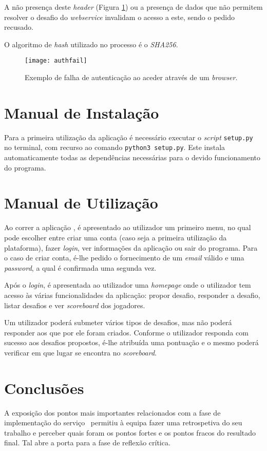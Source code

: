 A não presença deste \textit{header} (Figura \ref{fig::auth-fail}) ou a presença de dados que não permitem resolver o desafio do \textit{webservice} invalidam o acesso a este, sendo o pedido recusado.

O algoritmo de \textit{hash} utilizado no processo é o \textit{SHA256}.

\begin{figure}[!htbp]
    \centering
    \texttt{[image: authfail]}
    \caption[Falha de autenticação]{Exemplo de falha de autenticação ao aceder através de um \textit{browser}.}
    \label{fig::auth-fail}
\end{figure}



\section{Manual de Instalação}
\label{sec::implementacao:maninstall}

Para a primeira utilização da aplicação é necessário executar o \textit{script} \verb|setup.py| no terminal, com recurso ao comando \verb|python3 setup.py|. Este instala automaticamente todas as dependências necessárias para o devido funcionamento do programa.


\section{Manual de Utilização}
\label{sec::implementacao:manuser}

Ao correr a aplicação \appname, é apresentado ao utilizador um primeiro menu, no qual pode escolher entre criar uma conta (caso seja a primeira utilização da plataforma), fazer \textit{login}, ver informações da aplicação ou sair do programa.  Para o caso de criar conta, é-lhe pedido o fornecimento de um \textit{email} válido e uma \textit{password}, a qual é confirmada uma segunda vez.

Após o \textit{login}, é apresentada ao utilizador uma \textit{homepage} onde o utilizador tem acesso às várias funcionalidades da aplicação: propor desafio, responder a desafio, listar desafios e ver \textit{scoreboard} dos jogadores.

Um utilizador poderá submeter vários tipos de desafios, mas não poderá responder aos que por ele foram criados. Conforme o utilizador responda com sucesso aos desafios propostos, é-lhe atribuída uma pontuação e o mesmo poderá verificar em que lugar se encontra no \textit{scoreboard}.



\section{Conclusões}
\label{sec::implementacao:concs}

A exposição dos pontos mais importantes relacionados com a fase de implementação do serviço \appname~permitiu à equipa fazer uma retrospetiva do seu trabalho e perceber quais foram os pontos fortes e os pontos fracos do resultado final. Tal abre a porta para a fase de reflexão crítica.

